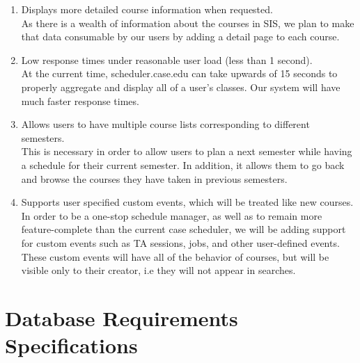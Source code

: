 \documentclass[pdftex,12pt,letter]{article}
\begin{document}
\begin{enumerate}[1.]
\item Displays more detailed course information when requested.\\
As there is a wealth of information about the courses in SIS, we plan to make that data consumable by our users by adding a detail page to each course.
\item Low response times under reasonable user load (less than 1 second).\\
At the current time, scheduler.case.edu can take upwards of 15 seconds to properly aggregate and display all of a user's classes. Our system will have much faster response times.
\item Allows users to have multiple course lists corresponding to different semesters.\\
This is necessary in order to allow users to plan a next semester while having a schedule for their current semester. In addition, it allows them to go back and browse the courses they have taken in previous semesters.
\item Supports user specified custom events, which will be treated like new courses.\\
In order to be a one-stop schedule manager, as well as to remain more feature-complete than the current case scheduler, we will be adding support for custom events such as TA sessions, jobs, and other user-defined events. These custom events will have all of the behavior of courses, but will be visible only to their creator, i.e they will not appear in searches.
\end{enumerate}
\section*{Database Requirements Specifications}
\end{document}
